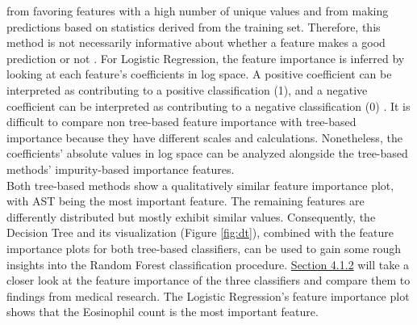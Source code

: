 from favoring features with a high number of unique values and from making 
predictions based on statistics derived from the training set. Therefore, this 
method is not necessarily informative about whether a feature makes a 
good prediction or not \cite{RN178}.
For Logistic Regression, the feature importance is inferred by looking at 
each feature's coefficients in log space. A positive coefficient can be 
interpreted as contributing to a positive classification (1), and a negative 
coefficient can be interpreted as contributing to a negative classification (0) 
\cite{RN174}.
It is difficult to compare non tree-based feature importance with tree-based 
importance because they have different scales and calculations. Nonetheless, 
the 
coefficients' absolute values in log space can be analyzed alongside the 
tree-based methods' impurity-based importance features.
\\
Both tree-based methods show a qualitatively similar feature importance plot, 
with AST being the most important feature. The remaining features are 
differently distributed but mostly exhibit similar values. Consequently, the 
Decision Tree and its visualization (Figure \ref{fig:dt}), combined with the 
feature importance plots for both tree-based classifiers, can be used to gain 
some rough insights into the Random Forest classification procedure. 
\hyperref[sec:medical]{Section 4.1.2} will take a closer look at the feature 
importance of the three classifiers and compare them to findings from medical 
research. The Logistic Regression's feature importance plot shows that the 
Eosinophil count is the most important feature.

